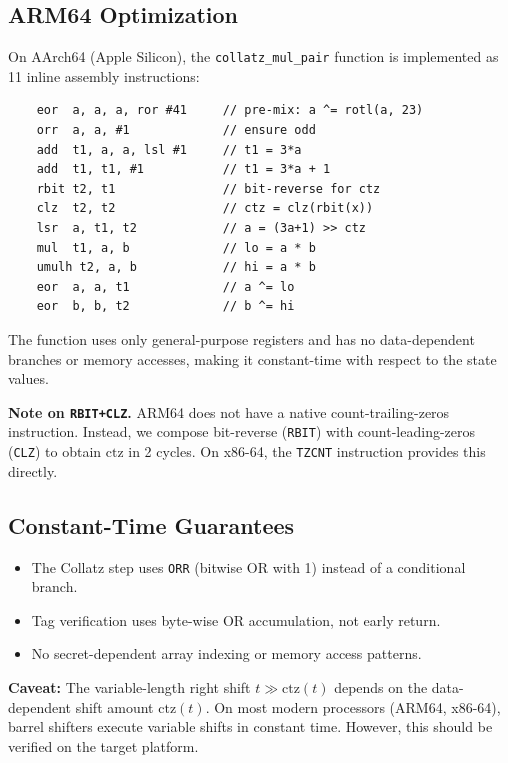 \documentclass[11pt,a4paper]{article}
\newcommand{\ctz}{\mathrm{ctz}}
\begin{document}
\subsection{ARM64 Optimization}

On AArch64 (Apple Silicon), the \texttt{collatz\_mul\_pair} function is
implemented as 11 inline assembly instructions:

{\small
\begin{verbatim}
    eor  a, a, a, ror #41     // pre-mix: a ^= rotl(a, 23)
    orr  a, a, #1             // ensure odd
    add  t1, a, a, lsl #1     // t1 = 3*a
    add  t1, t1, #1           // t1 = 3*a + 1
    rbit t2, t1               // bit-reverse for ctz
    clz  t2, t2               // ctz = clz(rbit(x))
    lsr  a, t1, t2            // a = (3a+1) >> ctz
    mul  t1, a, b             // lo = a * b
    umulh t2, a, b            // hi = a * b
    eor  a, a, t1             // a ^= lo
    eor  b, b, t2             // b ^= hi
\end{verbatim}
}

The function uses only general-purpose registers and has no
data-dependent branches or memory accesses, making it constant-time with
respect to the state values.

\textbf{Note on \texttt{RBIT+CLZ}.} ARM64 does not have a native
count-trailing-zeros instruction. Instead, we compose bit-reverse
(\texttt{RBIT}) with count-leading-zeros (\texttt{CLZ}) to obtain
$\ctz$ in 2 cycles. On x86-64, the \texttt{TZCNT} instruction
provides this directly.

\subsection{Constant-Time Guarantees}

\begin{itemize}
    \item The Collatz step uses \texttt{ORR} (bitwise OR with 1) instead
          of a conditional branch.
    \item Tag verification uses byte-wise OR accumulation, not early
          return.
    \item No secret-dependent array indexing or memory access patterns.
\end{itemize}

\textbf{Caveat:} The variable-length right shift $t \gg \ctz(t)$
depends on the data-dependent shift amount $\ctz(t)$. On most modern
processors (ARM64, x86-64), barrel shifters execute variable shifts in
constant time. However, this should be verified on the target platform.
\end{document}
